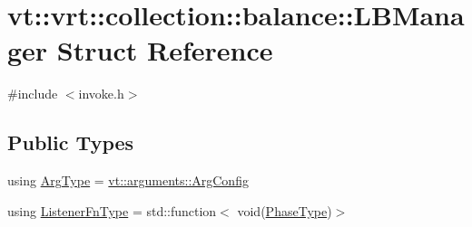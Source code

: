 \hypertarget{structvt_1_1vrt_1_1collection_1_1balance_1_1_l_b_manager}{}\section{vt\+:\+:vrt\+:\+:collection\+:\+:balance\+:\+:L\+B\+Manager Struct Reference}
\label{structvt_1_1vrt_1_1collection_1_1balance_1_1_l_b_manager}


{\ttfamily \#include $<$invoke.\+h$>$}

\subsection*{Public Types}
\begin{DoxyCompactItemize}
\item 
using \hyperlink{structvt_1_1vrt_1_1collection_1_1balance_1_1_l_b_manager_a25c1321de5a8a52b7c2c5d0d400d55d4}{Arg\+Type} = \hyperlink{structvt_1_1arguments_1_1_arg_config}{vt\+::arguments\+::\+Arg\+Config}
\item 
using \hyperlink{structvt_1_1vrt_1_1collection_1_1balance_1_1_l_b_manager_a1bb65b50c7cefb8c139a9f40a83ca18b}{Listener\+Fn\+Type} = std\+::function$<$ void(\hyperlink{namespacevt_a46ce6733d5cdbd735d561b7b4029f6d7}{Phase\+Type})$>$
\end{DoxyCompactItemize}
